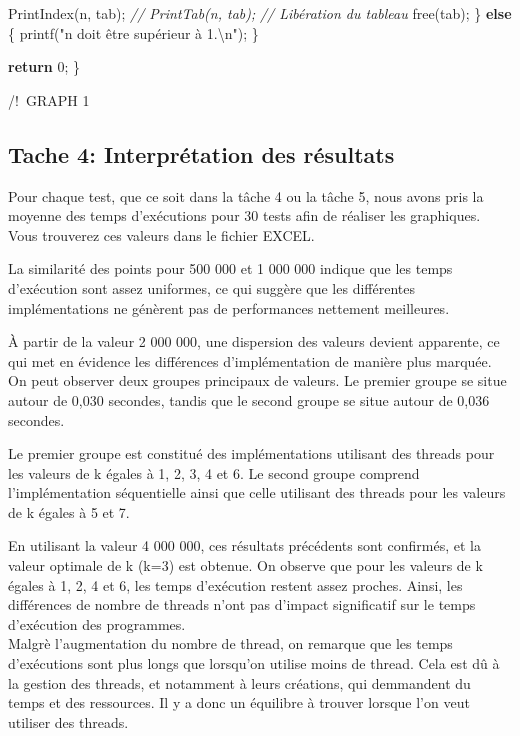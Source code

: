 \documentclass[
    ]{article}
\newenvironment{Shaded}{}{}
\newcommand{\CommentTok}[1]{\textcolor[rgb]{0.38,0.63,0.69}{\textit{#1}}}
\newcommand{\ControlFlowTok}[1]{\textcolor[rgb]{0.00,0.44,0.13}{\textbf{#1}}}
\newcommand{\DecValTok}[1]{\textcolor[rgb]{0.25,0.63,0.44}{#1}}
\newcommand{\NormalTok}[1]{#1}
\newcommand{\SpecialCharTok}[1]{\textcolor[rgb]{0.25,0.44,0.63}{#1}}
\newcommand{\StringTok}[1]{\textcolor[rgb]{0.25,0.44,0.63}{#1}}
\begin{document}
\begin{Shaded}
\begin{Highlighting}[]
\NormalTok{        PrintIndex(n, tab);}
        \CommentTok{// PrintTab(n, tab);}
        \CommentTok{// Libération du tableau}
\NormalTok{        free(tab);}
\NormalTok{    \}}
    \ControlFlowTok{else}
\NormalTok{    \{}
\NormalTok{        printf(}\StringTok{"n doit être supérieur à 1.}\SpecialCharTok{\textbackslash{}n}\StringTok{"}\NormalTok{);}
\NormalTok{    \}}

    \ControlFlowTok{return} \DecValTok{0}\NormalTok{;}
\NormalTok{\}}
\end{Highlighting}
\end{Shaded}
\pagebreak

/!~GRAPH 1\\
\pagebreak 

\hypertarget{tache-4-interpruxe9tation-des-ruxe9sultats}{%
\subsection{Tache 4: Interprétation des
résultats}\label{tache-4-interpruxe9tation-des-ruxe9sultats}}

Pour chaque test, que ce soit dans la tâche 4 ou la tâche 5, nous avons
pris la moyenne des temps d'exécutions pour 30 tests afin de réaliser
les graphiques. Vous trouverez ces valeurs dans le fichier EXCEL.

La similarité des points pour 500 000 et 1 000 000 indique que les temps
d'exécution sont assez uniformes, ce qui suggère que les différentes
implémentations ne génèrent pas de performances nettement meilleures.

À partir de la valeur 2 000 000, une dispersion des valeurs devient
apparente, ce qui met en évidence les différences d'implémentation de
manière plus marquée. On peut observer deux groupes principaux de
valeurs. Le premier groupe se situe autour de 0,030 secondes, tandis que
le second groupe se situe autour de 0,036 secondes.

Le premier groupe est constitué des implémentations utilisant des
threads pour les valeurs de k égales à 1, 2, 3, 4 et 6. Le second groupe
comprend l'implémentation séquentielle ainsi que celle utilisant des
threads pour les valeurs de k égales à 5 et 7.

En utilisant la valeur 4 000 000, ces résultats précédents sont
confirmés, et la valeur optimale de k (k=3) est obtenue. On observe que
pour les valeurs de k égales à 1, 2, 4 et 6, les temps d'exécution
restent assez proches. Ainsi, les différences de nombre de threads n'ont
pas d'impact significatif sur le temps d'exécution des programmes.\\
Malgrè l'augmentation du nombre de thread, on remarque que les temps
d'exécutions sont plus longs que lorsqu'on utilise moins de thread. Cela
est dû à la gestion des threads, et notamment à leurs créations, qui
demmandent du temps et des ressources. Il y a donc un équilibre à
trouver lorsque l'on veut utiliser des threads.
\end{document}
